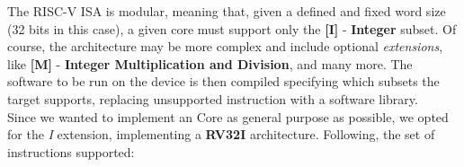 \documentclass[10pt,  english, makeidx, a4paper, titlepage, oneside]{book}
\begin{document}
The RISC-V ISA is modular, meaning that, given a defined and fixed word size (32 bits in this case), a given core must support only the \textbf{[I]} - \textbf{Integer} subset. Of course, the architecture may be more complex and include optional \textit{extensions}, like \textbf{[M]} - \textbf{Integer Multiplication and Division}, and many more. The software to be run on the device is then compiled specifying which subsets the target supports, replacing unsupported instruction with a software library.\\
Since we wanted to implement an Core as general purpose as possible, we opted for the \textit{I} extension, implementing a \textbf{RV32I} architecture.
Following, the set of instructions supported:
\end{document}
